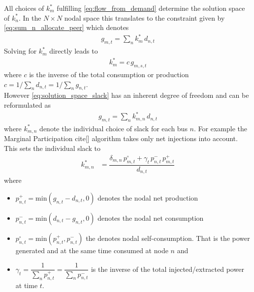 \documentclass[11pt,twocolumn]{article}
\newcommand{\generation}[1][n]{g_{#1,s,t}}
\newcommand{\nodalgeneration}[1][n]{g_{#1,t}}
\newcommand{\nodaldemand}[1][n]{d_{#1,t}}
\newcommand{\slackk}[1][n]{k^*_{#1}}
\newcommand{\Slackk}{k^*_{m,n}}
\newcommand{\injection}{p_{n,t}}
\newcommand{\netconsumption}[1][n]{p^{-}_{#1,t}}
\newcommand{\netproduction}[1][n]{p^{+}_{#1,t}}
\newcommand{\selfconsumption}[1][n]{p^{\circ}_{#1,t}}
\begin{document}
All choices of $\slackk[m]$ fulfilling \cref{eq:flow_from_demand} determine the solution space of $\slackk$. In the $N \times N$ nodal space this translates to the constraint given by \cref{eq:sum_n_allocate_peer} which denotes
\begin{align}
 \nodalgeneration[m] = \sum_n \slackk[m] \, \nodaldemand  
 \label{eq:solution_space_slack}
\end{align}
Solving for $\slackk[m]$ directly leads to 
\begin{align}
 \slackk[m] = c \, \generation[m] 
\end{align}
where $c$ is the inverse of the total consumption or production $c = 1 / \sum_n \nodaldemand   = 1 / \sum_n \nodalgeneration$. \\
However \cref{eq:solution_space_slack} has an inherent degree of freedom and can be reformulated as 
\begin{align}
 \nodalgeneration[m] = \sum_n \Slackk \, \nodaldemand  
 \label{eq:solution_space_slack_extended}
\end{align}
where $\Slackk$ denote the individual choice of slack for each bus $n$. For example the Marginal Participation cite[] algorithm takes only net injections into account. This sets the individual slack to 
\begin{align}
\Slackk &= \dfrac{ \delta_{m,n}\,\selfconsumption[m] + \gamma_t \, \netconsumption  \, \netproduction[m]}{\nodaldemand}
\end{align}
where 
\begin{itemize}
 \item $\netproduction = \text{min}\left( \nodalgeneration - \nodaldemand , 0 \right) $ denotes the nodal net production 
 \item $\netconsumption = \text{min}\left( \nodaldemand  - \nodalgeneration, 0 \right)$ denotes the nodal net consumption
 \item $\selfconsumption = \text{min}\left( \netproduction, \netconsumption \right)$ the denotes  nodal self-consumption. That is the power generated and at the same time consumed at node $n$ and 
 \item $\gamma_t = \dfrac{1}{\sum_n \netproduction} = \dfrac{1}{\sum_n \netconsumption}$ is the inverse of the total injected/extracted power at time $t$.
\end{itemize}





% 
\printbibliography
\end{document}
